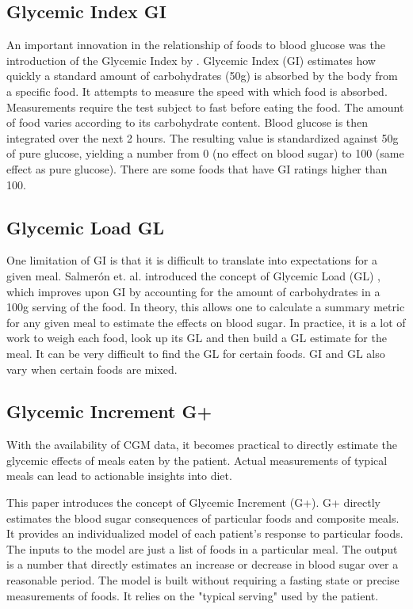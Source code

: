 \documentclass[conference]{IEEEtran}
\begin{document}
\subsection{Glycemic Index GI}

An important innovation in the relationship of foods to blood glucose was the introduction of the Glycemic Index by \cite{Jenkins_1981}. Glycemic Index (GI) estimates how quickly a standard amount of carbohydrates (50g) is absorbed by the body from a specific food. It attempts to measure the speed with which food is absorbed. Measurements require the test subject to fast before eating the food. The amount of food varies according to its carbohydrate content. Blood glucose is then integrated over the next 2 hours. The resulting value is standardized against 50g of pure glucose, yielding a number from 0 (no effect on blood sugar) to 100 (same effect as pure glucose). There are some foods that have GI ratings higher than 100.

\subsection{Glycemic Load GL}

One limitation of GI is that it is difficult to translate into expectations for a given meal. Salmerón et. al. introduced the concept of Glycemic Load (GL) \cite{Salmeron_1997}, which improves upon GI by accounting for the amount of carbohydrates in a 100g serving of the food. In theory, this allows one to calculate a summary metric for any given meal to estimate the effects on blood sugar. In practice, it is a lot of work to weigh each food, look up its GL and then build a GL estimate for the meal. It can be very difficult to find the GL for certain foods. GI and GL also vary when certain foods are mixed.

\subsection{Glycemic Increment G+}

With the availability of CGM data, it becomes practical to directly estimate the glycemic effects of meals eaten by the patient. Actual measurements of typical meals can lead to actionable insights into diet.

This paper introduces the concept of Glycemic Increment (G+). G+ directly estimates the blood sugar consequences of particular foods and composite meals. It provides an individualized model of each patient's response to particular foods. The inputs to the model are just a list of foods in a particular meal. The output is a number that directly estimates an increase or decrease in blood sugar over a reasonable period. The model is built without requiring a fasting state or precise measurements of foods. It relies on the "typical serving" used by the patient.
\end{document}
